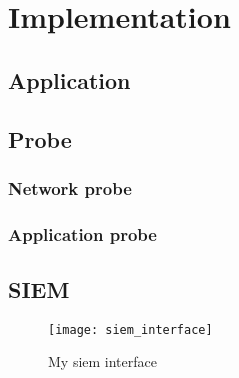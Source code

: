 
\chapter{Implementation}

\section{Application}


\section{Probe}

\subsection{Network probe}

\subsection{Application probe}


\section{SIEM}

\begin{figure}[h]
  \centering
  \texttt{[image: siem\_interface]}
  \caption{My siem interface}
  \label{fig:mysiem}
\end{figure}

